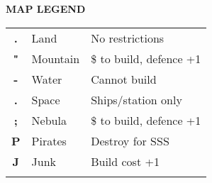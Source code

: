 \begin{flushleft}
\textbf{MAP LEGEND}
\end{flushleft}
\begin{tabular}{|c|ll}
\hhline{-}
\cellcolor{land}\textbf{.} & Land
                           & {\color{supplemental} No restrictions}       \\ \hhline{-}
\cellcolor{mountain}\textbf{"} & Mountain
                           & {\color{supplemental} \$ to build, defence +1}           \\ \hhline{-}
\cellcolor{water}\textbf{-} & Water
                           & {\color{supplemental} Cannot build}          \\ \hhline{-}
\cellcolor{space}\textcolor{stars}{\textbf{.}}            & Space
                           & {\color{supplemental} Ships/station only} \\ \hhline{-}
\cellcolor{nebula}\textcolor{stars}{\textbf{;}} & Nebula
                           & {\color{supplemental} \$ to build, defence +1}       \\ \hhline{-}
\cellcolor{space}\textcolor{stars}{\textbf{P}} & Pirates
                           & {\color{supplemental} Destroy for SSS}         \\ \hhline{-}
\cellcolor{space}\textcolor{stars}{\textbf{J}} & Junk
                           & {\color{supplemental} Build cost +1}         \\ \hhline{-}
\end{tabular}
